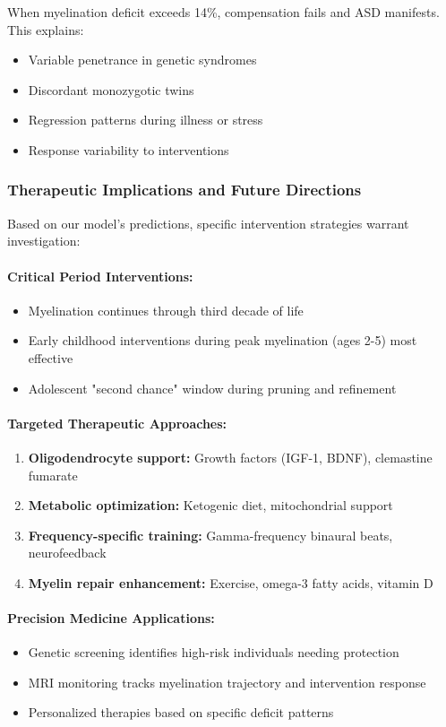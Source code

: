 \documentclass[11pt]{article}
\let\oldsubsubsection\subsubsection
\renewcommand{\subsubsection}[1]{\oldsubsubsection{#1}\setlength{\leftskip}{1.5em}}
\begin{document}
When myelination deficit exceeds 14\%, compensation fails and ASD manifests. This explains:
\begin{itemize}
\item Variable penetrance in genetic syndromes
\item Discordant monozygotic twins
\item Regression patterns during illness or stress
\item Response variability to interventions
\end{itemize}

\subsubsection{Therapeutic Implications and Future Directions}

Based on our model's predictions, specific intervention strategies warrant investigation:

\paragraph{Critical Period Interventions:}
\begin{itemize}
\item Myelination continues through third decade of life
\item Early childhood interventions during peak myelination (ages 2-5) most effective
\item Adolescent "second chance" window during pruning and refinement
\end{itemize}

\paragraph{Targeted Therapeutic Approaches:}
\begin{enumerate}
\item \textbf{Oligodendrocyte support:} Growth factors (IGF-1, BDNF), clemastine fumarate
\item \textbf{Metabolic optimization:} Ketogenic diet, mitochondrial support
\item \textbf{Frequency-specific training:} Gamma-frequency binaural beats, neurofeedback
\item \textbf{Myelin repair enhancement:} Exercise, omega-3 fatty acids, vitamin D
\end{enumerate}

\paragraph{Precision Medicine Applications:}
\begin{itemize}
\item Genetic screening identifies high-risk individuals needing protection
\item MRI monitoring tracks myelination trajectory and intervention response
\item Personalized therapies based on specific deficit patterns
\end{itemize}
\end{document}
